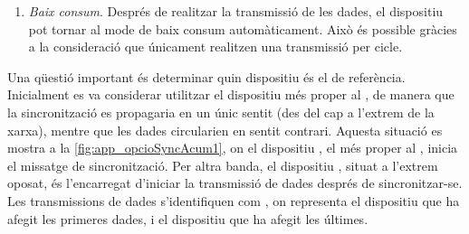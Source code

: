 \documentclass{tfgitic}[2024/07/01]
\begin{document}
{\begin{enumerate}
    Aquest mecanisme és important, ja que evita perdre les dades de tots els dispositius si un falla. A més, afegeix un mecanisme de detecció d'errors: si existeixen 10 dispositius però només rebem 5 valors de dades, podem assegurar que, com a mínim, hi ha hagut un error en la transmissió entre els dispositius 6 i 5. Si no hi hagués hagut aquest error, el dispositiu 5 hauria rebut les dades del dispositiu 6, hi hauria afegit les seves i, per tant, hauríem rebut com a mínim 6 valors de dades.
    \item \emph{Baix consum}. Després de realitzar la transmissió de les dades, el dispositiu pot tornar al mode de baix consum automàticament. Això és possible gràcies a la consideració que únicament realitzen una transmissió per cicle.
\end{enumerate}


Una qüestió important és determinar quin dispositiu és el de referència. Inicialment es va considerar utilitzar el dispositiu més proper al , de manera que la sincronització es propagaria en un únic sentit (des del  cap a l'extrem de la xarxa), mentre que les dades circularien en sentit contrari. Aquesta situació es mostra a la \autoref{fig:app_opcioSyncAcum1}, on el dispositiu , el més proper al , inicia el missatge de sincronització. Per altra banda, el dispositiu , situat a l'extrem oposat, és l'encarregat d'iniciar la transmissió de dades després de sincronitzar-se. Les transmissions de dades s'identifiquen com , on  representa el dispositiu que ha afegit les primeres dades, i  el dispositiu que ha afegit les últimes.

}
\end{document}
